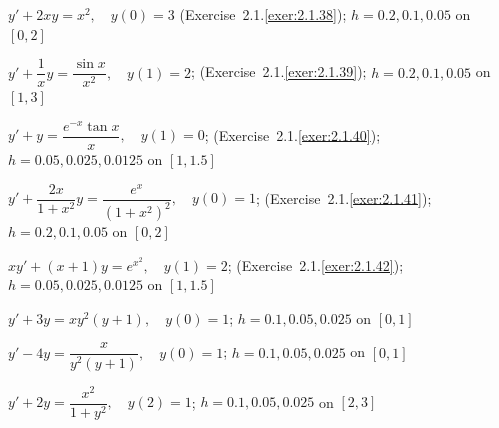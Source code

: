 \begin{exerciselist}
\item\label{exer:3.1.15}\Cex
$y'+2xy=x^2,\quad y(0)=3$\;
({Exercise~2.1.\ref{exer:2.1.38}});  \;
$h=0.2,0.1,0.05$ on $[0,2]$


\item\label{exer:3.1.16}\Cex
$y'+\dfrac{1}{x}y=\dfrac{\sin x}{x^2},\quad y(1)=2$;\;
({Exercise~2.1.\ref{exer:2.1.39}});  \;
$h=0.2,0.1,0.05$ on $[1,3]$


\item\label{exer:3.1.17}\Cex
$y'+y=\dfrac{e^{-x}\tan x}{x},\quad y(1)=0$;\;
({Exercise~2.1.\ref{exer:2.1.40}});  \;
$h=0.05,0.025,0.0125$ on $[1,1.5]$



\item\label{exer:3.1.18}\Cex
$y'+\dfrac{2x}{1+x^2}y=\dfrac{e^x}{(1+x^2)^2}, \quad y(0)=1$;
\; ({Exercise~2.1.\ref{exer:2.1.41}});  \;
$h=0.2,0.1,0.05$ on $[0,2]$


\item\label{exer:3.1.19}\Cex
$xy'+(x+1)y=e^{x^2},\quad y(1)=2$;\;
({Exercise~2.1.\ref{exer:2.1.42}});  \;
$h=0.05,0.025,0.0125$ on $[1,1.5]$



\item\label{exer:3.1.20}\Cex
$y'+3y=xy^2(y+1),\quad y(0)=1$;  \;
$h=0.1,0.05,0.025$ on $[0,1]$

\item\label{exer:3.1.21}\Cex
$y'-4y=\dfrac{x}{y^2(y+1)},\quad y(0)=1$;  \;
 $h=0.1,0.05,0.025$ on $[0,1]$

\item\label{exer:3.1.22}\Cex
$y'+2y=\dfrac{x^2}{1+y^2},\quad y(2)=1$;  \;
 $h=0.1,0.05,0.025$ on $[2,3]$


\end{exerciselist}
